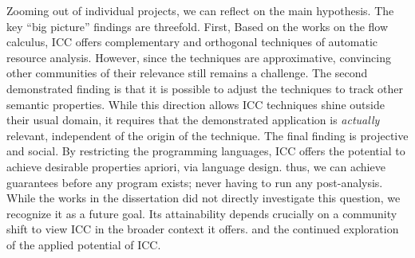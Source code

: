 Zooming out of individual projects, we can reflect on the main hypothesis.
The key \enquote{big picture} findings are threefold.
First, Based on the works on the flow calculus, ICC offers complementary and orthogonal techniques of automatic resource analysis.
However, since the techniques are approximative, convincing other communities of their relevance still remains a challenge.
The second demonstrated finding is that it is possible to adjust the techniques to track other semantic properties.
While this direction allows ICC techniques shine outside their usual domain, it requires that the demonstrated application is \emph{actually} relevant,
independent of the origin of the technique.
The final finding is projective and social.
By restricting the programming languages, ICC offers the potential to achieve desirable properties apriori, via language design.
thus, we can achieve guarantees before any program exists;
never having to run any post-analysis.
While the works in the dissertation did not directly investigate this question, we recognize it as a future goal.
Its attainability depends crucially on a community shift to view ICC in the broader context it offers.
and the continued exploration of the applied potential of ICC.
